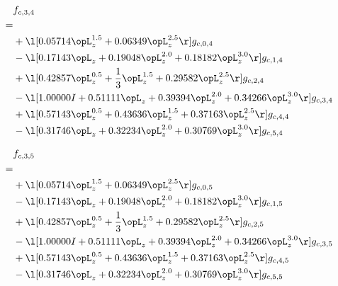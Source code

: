 \begin{alignat}{2} 
\label{eq:f_34_0} 
& f_{c,3,4} \nonumber \\ 
 = \\ 
& + \l[  0.05714 \opL_z^{1.5} +  0.06349 \opL_z^{2.5}  \r] g_{c,0,4} \nonumber \\ 
& - \l[  0.17143 \opL_z +  0.19048 \opL_z^{2.0} +  0.18182 \opL_z^{3.0}  \r] g_{c,1,4} \nonumber \\ 
& + \l[  0.42857 \opL_z^{0.5} + \frac{1}{3} \opL_z^{1.5} +  0.29582 \opL_z^{2.5}  \r] g_{c,2,4} \nonumber \\ 
& - \l[  1.00000 I +  0.51111 \opL_z +  0.39394 \opL_z^{2.0} +  0.34266 \opL_z^{3.0}  \r] g_{c,3,4} \nonumber \\ 
& + \l[  0.57143 \opL_z^{0.5} +  0.43636 \opL_z^{1.5} +  0.37163 \opL_z^{2.5}  \r] g_{c,4,4} \nonumber \\ 
& - \l[  0.31746 \opL_z +  0.32234 \opL_z^{2.0} +  0.30769 \opL_z^{3.0}  \r] g_{c,5,4} \nonumber \\ 
\end{alignat} 


\begin{alignat}{2} 
\label{eq:f_35_0} 
& f_{c,3,5} \nonumber \\ 
 = \\ 
& + \l[  0.05714 \opL_z^{1.5} +  0.06349 \opL_z^{2.5}  \r] g_{c,0,5} \nonumber \\ 
& - \l[  0.17143 \opL_z +  0.19048 \opL_z^{2.0} +  0.18182 \opL_z^{3.0}  \r] g_{c,1,5} \nonumber \\ 
& + \l[  0.42857 \opL_z^{0.5} + \frac{1}{3} \opL_z^{1.5} +  0.29582 \opL_z^{2.5}  \r] g_{c,2,5} \nonumber \\ 
& - \l[  1.00000 I +  0.51111 \opL_z +  0.39394 \opL_z^{2.0} +  0.34266 \opL_z^{3.0}  \r] g_{c,3,5} \nonumber \\ 
& + \l[  0.57143 \opL_z^{0.5} +  0.43636 \opL_z^{1.5} +  0.37163 \opL_z^{2.5}  \r] g_{c,4,5} \nonumber \\ 
& - \l[  0.31746 \opL_z +  0.32234 \opL_z^{2.0} +  0.30769 \opL_z^{3.0}  \r] g_{c,5,5} \nonumber \\ 
\end{alignat} 


